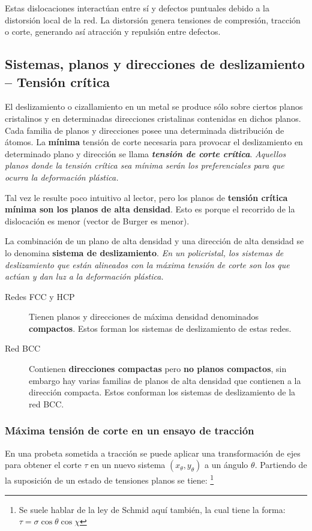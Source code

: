 Estas dislocaciones interactúan entre sí y defectos puntuales debido a la distorsión local de la red. La distorsión genera tensiones de compresión, tracción o corte, generando así atracción y repulsión entre defectos.

\subsection[Sistemas de deslizamiento]{Sistemas, planos y direcciones de deslizamiento -- Tensión crítica }


El deslizamiento o cizallamiento en un metal se produce sólo sobre ciertos planos cristalinos y en determinadas direcciones cristalinas contenidas en dichos planos. Cada familia de planos y direcciones posee una determinada distribución de átomos. La \textbf{mínima} tensión de corte necesaria para provocar el deslizamiento en determinado plano y dirección se llama {\it \bf tensión de corte crítica}. {\it Aquellos planos donde la tensión crítica sea mínima serán los preferenciales para que ocurra la deformación plástica.}

Tal vez le resulte poco intuitivo al lector, pero los planos de \textbf{tensión crítica mínima son los planos de alta densidad}. Esto es porque el recorrido de la dislocación es menor (vector de Burger es menor).

La combinación de un plano de alta densidad y una dirección de alta densidad se lo denomina \textbf{sistema de deslizamiento}. {\it En un policristal, los sistemas de deslizamiento que están alineados con la máxima tensión de corte son los que actúan y dan luz a la deformación plástica.}

\begin{description}
	\item[Redes FCC y HCP] Tienen planos y direcciones de máxima densidad denominados \textbf{compactos}. Estos forman los sistemas de deslizamiento de estas redes.
	\item[Red BCC] Contienen \textbf{direcciones compactas} pero \textbf{no planos compactos}, sin embargo hay varias familias de planos de alta densidad que contienen a la dirección compacta. Estos conforman los sistemas de deslizamiento de la red BCC.  
\end{description}


\subsubsection{Máxima tensión de corte en un ensayo de tracción} \label{sssec:max_corte_ensayotraccion}
En una probeta sometida a tracción se puede aplicar una transformación de ejes para obtener el corte $\tau$ en un nuevo sistema $(x_\theta, y_\theta)$ a un ángulo $\theta$. Partiendo de la suposición de un estado de tensiones planos se tiene:
\footnote{Se suele hablar de la ley de Schmid aquí también, la cual tiene la forma: $\tau = \sigma \cos \theta \cos \chi$}

